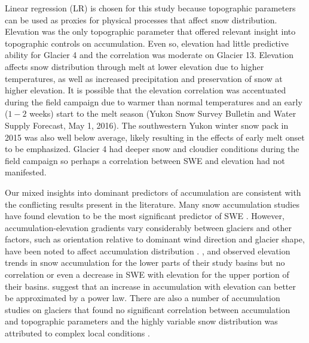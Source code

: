 \documentclass[review,oneside, letterpaper]{igs}
\begin{document}
Linear regression (LR) is chosen for this study because topographic parameters can be used as proxies for physical processes that affect snow distribution. Elevation was the only topographic parameter that offered relevant insight into topographic controls on accumulation. Even so, elevation had little predictive ability for Glacier 4 and the correlation was moderate on Glacier 13. Elevation affects snow distribution through melt at lower elevation due to higher temperatures, as well as increased precipitation and preservation of snow at higher elevation. It is possible that the elevation correlation was accentuated during the field campaign due to warmer than normal temperatures and an early ($1-2$ weeks) start to the melt season (Yukon Snow Survey Bulletin and Water Supply Forecast, May 1, 2016). The southwestern Yukon winter snow pack in 2015 was also well below average, likely resulting in the effects of early melt onset to be emphasized. Glacier 4 had deeper snow and cloudier conditions during the field campaign so perhaps a correlation between SWE and elevation had not manifested. 

Our mixed insights into dominant predictors of accumulation are consistent with the conflicting results present in the literature. Many snow accumulation studies have found elevation to be the most significant predictor of SWE \citep[e.g.][]{Machguth2006, McGrath2015}. However, accumulation-elevation gradients vary considerably between glaciers \citep{Winther1998} and other factors, such as orientation relative to dominant wind direction and glacier shape, have been noted to affect accumulation distribution \citep{Machguth2006,Grabiec2011}.  \cite{Machguth2006}, \cite{Grunewald2014} and \cite{Kirchner2014} observed elevation trends in snow accumulation for the lower parts of their study basins but no correlation or even a decrease in SWE with elevation for the upper portion of their basins. \cite{Helbig2017} suggest that an increase in accumulation with elevation can better be approximated by a power law. There are also a number of accumulation studies on glaciers that found no significant correlation between accumulation and topographic parameters and the highly variable snow distribution was attributed to complex local conditions \citep[e.g.][]{Grabiec2011,Lopez2011}.
\end{document}
